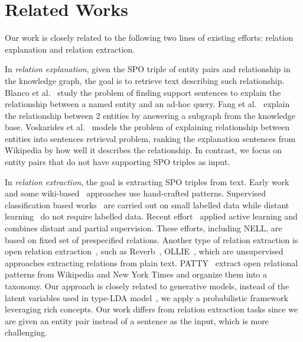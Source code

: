 \section{Related Works}
\label{sec:rel}

Our work is closely related to the following two lines of existing efforts: relation explanation and relation extraction.

In \emph{relation explanation}, given the SPO triple of entity pairs and relationship in the knowledge graph, the goal is to retrieve text describing such relationship.
Blanco et al.~\cite{blanco2010finding} study the problem of finding support sentences to explain the relationship between a named entity and an ad-hoc query.
Fang et al.~\cite{fang2011rex} explain the relationship between 2 entities by answering a subgraph from the knowledge base.
Voskarides et al.~\cite{voskarideslearning} models the problem of explaining relationship between entities into sentences retrieval problem, ranking the explanation sentences from Wikipedia by how well it describes the relationship.
In contrast, we focus on entity pairs that do not have supporting SPO triples as input.

In \emph{relation extraction}, the goal is extracting SPO triples from text.
Early work~\cite{hearst1992automatic,brin1999extracting,agichtein2000snowball} and some wiki-based~\cite{ponzetto2008wikitaxonomy} approaches use hand-crafted patterns.
Supervised classification based works~\cite{doddington2004automatic,guodong2005exploring} are carried out on small labelled data while distant learning~\cite{craven1999constructing,wu2007autonomously,bunescu2007learning,mintz2009distant} do not require labelled data.
Recent effort~\cite{angeli2014combining} applied active learning and combines distant and partial supervision.
These efforts, including NELL, are based on fixed set of prespecified relations.
Another type of relation extraction is open relation extraction~\cite{banko2007open}, such as Reverb~\cite{fader2011identifying}, OLLIE~\cite{schmitz2012open}, which are unsupervised approaches extracting relations from plain text.
PATTY~\cite{nakashole2012patty} extract open relational patterns from Wikipedia and New York Times and organize them into a taxonomy.
Our approach is closely related to generative models, instead of the latent variables used in type-LDA model~\cite{yao2011structured}, we apply a probabilistic framework leveraging rich concepts.
Our work differs from relation extraction tasks since we are given an entity pair instead of a sentence as the input, which is more challenging.

